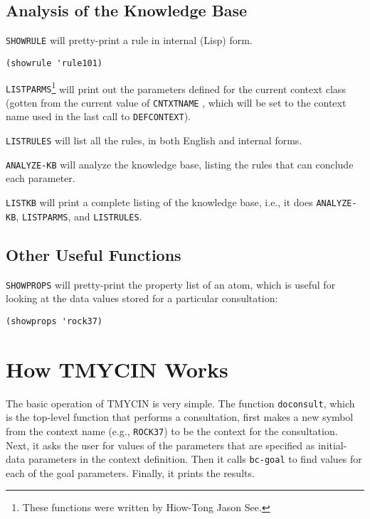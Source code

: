 \subsection{Analysis of the Knowledge Base}

{\tt SHOWRULE} will pretty-print a rule in internal (Lisp) form.

\begin{verbatim}
(showrule 'rule101)
\end{verbatim}

{\tt LISTPARMS}\footnote{These functions were written by Hiow-Tong Jason See.}
will print out the parameters defined for the current context
class (gotten from the current value of {\tt CNTXTNAME} , which will be set to
the context name used in the last call to {\tt DEFCONTEXT}).

{\tt LISTRULES} will list all the rules, in both English and internal forms.

{\tt ANALYZE-KB} will analyze the knowledge base, listing the rules that can
conclude each parameter.

{\tt LISTKB} will print a complete listing of the knowledge base, i.e., it does
{\tt ANALYZE-KB}, {\tt LISTPARMS}, and {\tt LISTRULES}.

\subsection{Other Useful Functions}

{\tt SHOWPROPS} will pretty-print the property list of an atom, which is useful
for looking at the data values stored for a particular consultation:

\begin{verbatim}
(showprops 'rock37)
\end{verbatim}

\section{How TMYCIN Works}

The basic operation of TMYCIN is very simple.  The function {\tt doconsult},
which is the top-level function that performs a consultation, first makes
a new symbol from the context name (e.g., {\tt ROCK37}) to be the context
for the consultation.  Next, it asks the user for values of the parameters
that are specified as initial-data parameters in the context definition.
Then it calls {\tt bc-goal} to find values for each of the goal parameters.
Finally, it prints the results.

